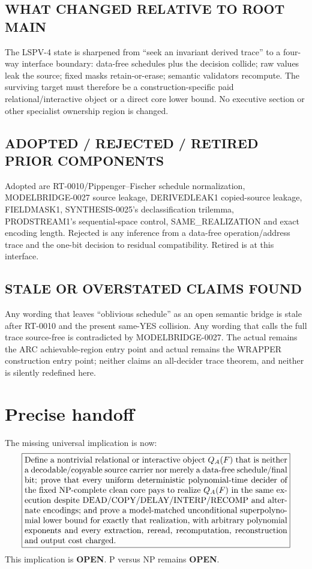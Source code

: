 \documentclass[11pt]{article}
\newcommand{\OPEN}{\textbf{OPEN}}
\newcommand{\claim}[1]{\texttt{\detokenize{#1}}}
\begin{document}
\subsection*{WHAT CHANGED RELATIVE TO ROOT MAIN}
The LSPV-4 state is sharpened from ``seek an invariant derived trace'' to a
four-way interface boundary: data-free schedules plus the decision collide;
raw values leak the source; fixed masks retain-or-erase; semantic validators
recompute.  The surviving target must therefore be a construction-specific
paid relational/interactive object or a direct core lower bound.  No executive
section or other specialist ownership region is changed.

\subsection*{ADOPTED / REJECTED / RETIRED PRIOR COMPONENTS}
Adopted are RT-0010/Pippenger--Fischer schedule normalization,
MODELBRIDGE-0027 source leakage, DERIVEDLEAK1 copied-source leakage,
FIELDMASK1, SYNTHESIS-0025's declassification trilemma, PRODSTREAM1's
sequential-space control, SAME\_REALIZATION and exact encoding length.
Rejected is any inference from a data-free operation/address trace and the
one-bit decision to residual compatibility.  Retired is
\claim{CONTROL-PLUS-DECISION-RECOVERS-COMPAT1} at this interface.

\subsection*{STALE OR OVERSTATED CLAIMS FOUND}
Any wording that leaves ``oblivious schedule'' as an open semantic bridge is
stale after RT-0010 and the present same-YES collision.  Any wording that calls
the full trace source-free is contradicted by MODELBRIDGE-0027.  The actual
 remains the ARC achievable-region entry point and actual
 remains the WRAPPER construction entry point; neither claims
an all-decider trace theorem, and neither is silently redefined here.

\section{Precise handoff}
The missing universal implication is now:
\[
 \boxed{\begin{minipage}{0.91\linewidth}
Define a nontrivial relational or interactive object $Q_A(F)$ that is neither
a decodable/copyable source carrier nor merely a data-free schedule/final bit;
prove that every uniform deterministic polynomial-time decider of the fixed
NP-complete clean core pays to realize $Q_A(F)$ in the same execution despite
DEAD/COPY/DELAY/INTERP/RECOMP and alternate encodings; and prove a
model-matched unconditional superpolynomial lower bound for exactly that
realization, with arbitrary polynomial exponents and every extraction,
reread, recomputation, reconstruction and output cost charged.
\end{minipage}}
\]
This implication is \OPEN.  P versus NP remains \OPEN.
\end{document}
